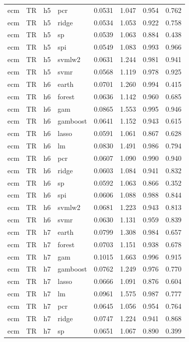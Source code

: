 \begin{ThreePartTable}
\begin{longtable}[t]{llclcccc}
ecm & TR & h5 & pcr & 0.0531 & 1.047 & 0.954 & 0.762\\
ecm & TR & h5 & ridge & 0.0534 & 1.053 & 0.922 & 0.758\\
ecm & TR & h5 & sp & 0.0539 & 1.063 & 0.884 & 0.438\\
ecm & TR & h5 & spi & 0.0549 & 1.083 & 0.993 & 0.966\\
ecm & TR & h5 & svmlw2 & 0.0631 & 1.244 & 0.981 & 0.941\\
ecm & TR & h5 & svmr & 0.0568 & 1.119 & 0.978 & 0.925\\
\addlinespace
ecm & TR & h6 & earth & 0.0701 & 1.260 & 0.994 & 0.415\\
ecm & TR & h6 & forest & 0.0636 & 1.142 & 0.960 & 0.685\\
ecm & TR & h6 & gam & 0.0865 & 1.553 & 0.995 & 0.946\\
ecm & TR & h6 & gamboost & 0.0641 & 1.152 & 0.943 & 0.615\\
ecm & TR & h6 & lasso & 0.0591 & 1.061 & 0.867 & 0.628\\
ecm & TR & h6 & lm & 0.0830 & 1.491 & 0.986 & 0.794\\
ecm & TR & h6 & pcr & 0.0607 & 1.090 & 0.990 & 0.940\\
ecm & TR & h6 & ridge & 0.0603 & 1.084 & 0.941 & 0.832\\
ecm & TR & h6 & sp & 0.0592 & 1.063 & 0.866 & 0.352\\
ecm & TR & h6 & spi & 0.0606 & 1.088 & 0.988 & 0.844\\
ecm & TR & h6 & svmlw2 & 0.0681 & 1.223 & 0.943 & 0.813\\
ecm & TR & h6 & svmr & 0.0630 & 1.131 & 0.959 & 0.839\\
\addlinespace
ecm & TR & h7 & earth & 0.0799 & 1.308 & 0.984 & 0.657\\
ecm & TR & h7 & forest & 0.0703 & 1.151 & 0.938 & 0.678\\
ecm & TR & h7 & gam & 0.1015 & 1.663 & 0.996 & 0.915\\
ecm & TR & h7 & gamboost & 0.0762 & 1.249 & 0.976 & 0.770\\
ecm & TR & h7 & lasso & 0.0666 & 1.091 & 0.876 & 0.604\\
ecm & TR & h7 & lm & 0.0961 & 1.575 & 0.987 & 0.777\\
ecm & TR & h7 & pcr & 0.0645 & 1.056 & 0.954 & 0.764\\
ecm & TR & h7 & ridge & 0.0747 & 1.224 & 0.941 & 0.868\\
ecm & TR & h7 & sp & 0.0651 & 1.067 & 0.890 & 0.399\\

\end{longtable}
\end{ThreePartTable}
